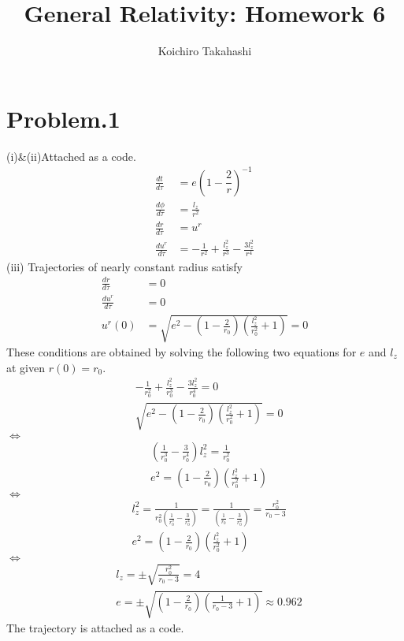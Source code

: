 \documentclass[12pt]{article}
\begin{document}
\title{General Relativity: Homework 6}
\author{Koichiro Takahashi}
\maketitle

\section*{Problem.1}
(i)\&(ii)Attached as a code.
\begin{align}
\frac{dt}{d\tau} &= e \left(1 - \dfrac{2}{r}\right)^{-1}\\
\frac{d\phi}{d\tau} &= \frac{l_z}{r^2}\\
\frac{dr}{d\tau} &= u^{r}\\
\frac{du^{r}}{d\tau} &= -\frac{1}{r^2} + \frac{l_z^2}{r^3} - \frac{3 l_z^2}{r^4}
\end{align}
(iii)
Trajectories of nearly constant radius satisfy
\begin{align}
\frac{dr}{d\tau} &= 0\\
\frac{du^{r}}{d\tau} &= 0\\
u^{r}(0) &= \sqrt{e^2 - \left(1 - \frac{2}{r_0}\right)\left(\frac{l_z^2}{r_0^2} + 1 \right)} = 0
\end{align}
These conditions are obtained by solving the following two equations for $e$ and $l_z$ at given $r(0) = r_0$.
\begin{align}
&-\frac{1}{r_0^2} + \frac{l_z^2}{r_0^3} - \frac{3l_z^2}{r_0^4} = 0\\
&\sqrt{e^2 - \left(1 - \frac{2}{r_0}\right)\left(\frac{l_z^2}{r_0^2} + 1 \right)} = 0
\end{align}
$\Leftrightarrow$
\begin{align}
&\left(\frac{1}{r_0^3} - \frac{3}{r_0^4}\right) l_z^2 = \frac{1}{r_0^2}\\
&e^2 = \left(1 - \frac{2}{r_0}\right)\left(\frac{l_z^2}{r_0^2} + 1 \right)
\end{align}
$\Leftrightarrow$
\begin{align}
&l_z^2 = \frac{1}{r_0^2\left(\frac{1}{r_0^3} - \frac{3}{r_0^4}\right)} = \frac{1}{\left(\frac{1}{r_0} - \frac{3}{r_0^2}\right)} = \frac{r_0^2}{r_0 - 3}\\
&e^2 = \left(1 - \frac{2}{r_0}\right)\left(\frac{l_z^2}{r_0^2} + 1 \right)
\end{align}
$\Leftrightarrow$
\begin{align}
&l_z = \pm \sqrt{\frac{r_0^2}{r_0 - 3}} = 4\\
&e = \pm \sqrt{\left(1 - \frac{2}{r_0}\right)\left(\frac{1}{r_0 - 3} + 1 \right)} \approx 0.962
\end{align}
The trajectory is attached as a code.
\end{document}
